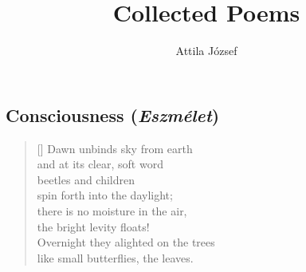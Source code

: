 \documentclass[a4paper,12pt,twoside,final]{book}
\title{Collected Poems}
\author{Attila József}
\begin{document}
\maketitle

\chapter{}
\section{Consciousness (\emph{Eszmélet})}


\settowidth{\versewidth}{Overnight they alighted on the trees}

\begin{verse}[\versewidth]
  Dawn unbinds sky from earth \\
  and at its clear, soft word \\
  beetles and children \\
  spin forth into the daylight; \\
  there is no moisture in the air, \\
  the bright levity floats! \\
  Overnight they alighted on the trees \\
  like small butterflies, the leaves.
\end{verse}


\newpage

\settowidth{\versewidth}{a hajnal s tiszta, lágy szavára}
\end{document}
